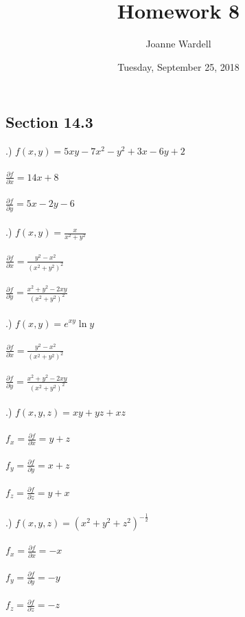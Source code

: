 \documentclass[12pt]{article}
\title{\vspace{-2.0cm}Homework 8}
\author{Joanne Wardell}
\date{Tuesday, September 25, 2018}
\begin{document}
\maketitle
\subsection*{Section 14.3}
.) $f(x,y) = 5xy-7x^{2}-y^{2}+3x-6y+2$\\\\
\noindent $\frac{\partial f}{\partial x} =  14x + 8$\\\\
\noindent $\frac{\partial f}{\partial y} = 5x -2y -6$\\\\


.) $f(x,y) = \frac{x}{x^{2}+y^{2}}$\\\\
\noindent $\frac{\partial f}{\partial x} =  \frac{y^{2} - x^{2}}{(x^{2} + y^{2})^{2}}$\\\\
\noindent $\frac{\partial f}{\partial y} = \frac{x^{2} + y^{2} - 2xy}{(x^{2} + y^{2})^{2}}$\\\\

.) $f(x,y) = e^{xy}\ln{y}$\\\\
\noindent $\frac{\partial f}{\partial x} =  \frac{y^{2} - x^{2}}{(x^{2} + y^{2})^{2}}$\\\\
\noindent $\frac{\partial f}{\partial y} = \frac{x^{2} + y^{2} - 2xy}{(x^{2} + y^{2})^{2}}$\\\\


.) $f(x,y,z) = xy+yz+xz$\\\\
\noindent $f_{x} = \frac{\partial f}{\partial x} = y + z$\\\\
\noindent $f_{y} = \frac{\partial f}{\partial y} = x + z$\\\\
\noindent $f_{z} = \frac{\partial f}{\partial z} = y + x$\\\\


.) $f(x,y,z)=(x^{2}+y^{2}+z^{2})^{-\frac{1}{2}}$\\\\
\noindent $f_{x} = \frac{\partial f}{\partial x} = -x$\\\\
\noindent $f_{y} = \frac{\partial f}{\partial y} = -y$\\\\
\noindent $f_{z} = \frac{\partial f}{\partial z} = -z$\clearpage
\end{document}

